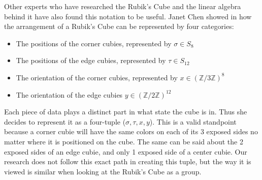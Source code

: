 \documentclass{article}
\begin{document}
Other experts who have researched the Rubik’s Cube and the linear algebra behind it have also found this notation to be useful.  Janet Chen showed in  how the arrangement of a Rubik’s Cube can be represented by four categories:
\begin{itemize}
    \item The positions of the corner cubies, represented by $\sigma \in S_8$
    \item The positions of the edge cubies, represented by $\tau \in S_{12}$
    \item The orientation of the corner cubies, represented by $x \in (\mathbb{Z}/3\mathbb{Z})^8$
    \item The orientation of the edge cubies $y \in (\mathbb{Z}/2\mathbb{Z})^{12}$
\end{itemize}
Each piece of data plays a distinct part in what state the cube is in.  Thus she decides to represent it as a four-tuple ($\sigma, \tau, x, y$).  This is a valid standpoint because a corner cubie will have the same colors on each of its 3 exposed sides no matter where it is positioned on the cube.  The same can be said about the 2 exposed sides of an edge cubie, and only 1 exposed side of a center cubie.  Our research does not follow this exact path in creating this tuple, but the way it is viewed is similar when looking at the Rubik’s Cube as a group.
\end{document}

